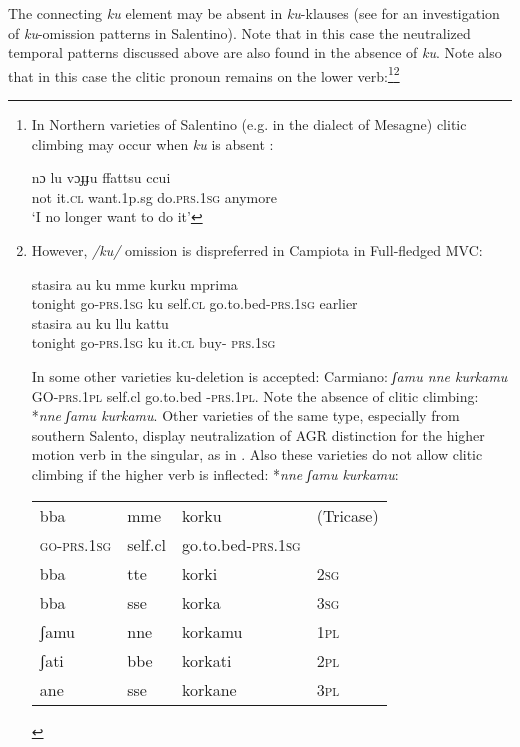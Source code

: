 \documentclass[output=paper]{langscibook}
\begin{document}
The connecting \textit{ku} element may be absent in \textit{ku}-klauses (see \citet{ledgeway2015a} for an investigation of \textit{ku}-omission patterns in Salentino).  Note that in this case the neutralized temporal patterns discussed above are also found in the absence of \textit{ku}. Note also that in this case the clitic pronoun remains on the lower verb:\footnote{In Northern varieties of Salentino (e.g. in the dialect of Mesagne) clitic climbing may occur when \textit{ku} is absent \citep{calabrese1993a, terzi1992a, terzi1994a, terzi1996a}:

\ea \label{fn8ex}\gll nɔ  lu  vɔɟɟu  ffattsu   ccui    \\
 not it.\textsc{cl}  want.1p.sg  do.\textsc{prs}.\textsc{1sg}  anymore\\
 \glt `I no longer want to do it’
\z

}\footnote{However, \textit{/ku/} omission is dispreferred in Campiota in Full-fledged MVC:

\ea \label{fn9ex}
    \ea \label{fn9exa} \gll stasira au      ku  mme    kurku       mprima\\
     tonight go-\textsc{prs}.\textsc{1sg}  ku self.\textsc{cl}  go.to.bed-\textsc{prs}.\textsc{1sg}  earlier\\
    \ex \label{fn9exb}\gll stasira  au       ku  llu   kattu\\
   tonight  go-\textsc{prs}.\textsc{1sg}  ku  it.\textsc{cl} buy- \textsc{prs}.\textsc{1sg} \\
    \z
\ex \label{fn9ex2}
    \z
\z

In some other varieties ku-deletion is accepted:  Carmiano: \textit{ʃamu nne kurkamu} GO-\textsc{prs}.\textsc{1pl} self.cl   go.to.bed -\textsc{prs}.\textsc{1pl}. Note the absence of clitic climbing:  *\textit{nne ʃamu kurkamu}.  Other varieties of the same type, especially from southern Salento, display neutralization of AGR distinction for the higher motion verb in the singular, as in .  Also these varieties do not allow clitic climbing if the higher verb is inflected: *\textit{nne ʃamu kurkamu}:

\ea \label{fn9ex3}
\begin{tabular}[t]{@{}llll@{}}
bba        & mme     & korku             & (Tricase) \\
\textsc{go-prs.1sg} & self.cl & go.to.bed-\textsc{prs.1sg} &    \\
bba        & tte     & korki             & \textsc{\textsc{2sg}}\\
bba        & sse     & korka             & \textsc{\textsc{3sg}}\\
ʃamu       & nne     & korkamu           & \textsc{\textsc{1pl}}\\
ʃati       & bbe     & korkati           & \textsc{\textsc{2pl}}\\
ane        & sse     & korkane           & \textsc{\textsc{3pl}}
\end{tabular}
\z}
\end{document}
